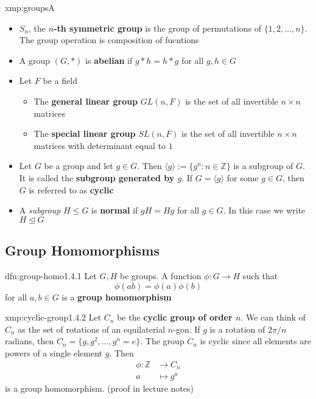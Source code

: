\documentclass{article}
\begin{document}
\begin{xmp}{xmp:groups}{A}
    \begin{itemize}
        \item[1.2.1] $S_{n}$, the \textbf{$n$-th symmetric group} is the group of permutations of $\{1,2,\dots,n\}$. The group operation is composition of fucntions
        \item[1.2.6] A group $(G, *)$ is \textbf{abelian} if $g * h = h * g$ for all $g, h\in G$
        \item Let $F$ be a field
            \begin{itemize}
                \item The \textbf{general linear group} $GL(n, F)$ is the set of all invertible $n \times n$ matrices
                \item The \textbf{special linear group} $SL (n, F)$ is the set of all invertible $n \times n$ matrices with determinant equal to $1$
            \end{itemize}
        \item[1.3.5] Let $G$ be a group and let $g\in G$. Then $\langle g \rangle := \{g^{n} : n\in \mathbb{Z}\}$ is a subgroup of $G$. It is called the \textbf{subgroup generated by $g$}. If $G = \langle g \rangle$ for some $g\in G$, then $G$ is referred to as \textbf{cyclic}
        \item[1.3.7] A \textit{subgroup} $H \le G$ is \textbf{normal} if $gH = Hg$ for all $g\in G$. In this case we write $H \unlhd G$
    \end{itemize}
\end{xmp}

\newpage
\subsection{Group Homomorphisms}

\begin{dfn}{dfn:group-homo}{1.4.1}
    Let $G, H$ be groups. A function $\phi : G \to H$ such that
    \[\phi(ab) = \phi(a)\phi(b)\]
    for all $a, b\in G$ is a \textbf{group homomorphism}
\end{dfn}

\begin{xmp}{xmp:cyclic-group}{1.4.2}
    Let $C_{n}$ be the \textbf{cyclic group of order $n$}. We can think of $C_{n}$ as the set of rotations of an equilaterial $n$-gon. If $g$ is a rotation of $2\pi / n$ radians, then $C_{n} = \{g, g^{2},\dots,g^{n} = e\}$. The group $C_{n}$ is cyclic since all elements are powers of a single element $g$. Then
    \begin{align*}
        \phi : \mathbb{Z} &\to C_{n}\\
        a & \mapsto g^{a}
    \end{align*}
    is a group homomorphism. (proof in lecture notes)
\end{xmp}
\end{document}
